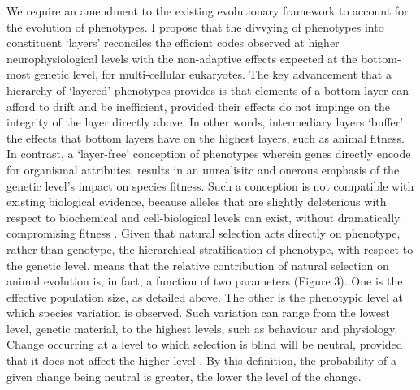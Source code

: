\documentclass{article}
\begin{document}
We require an amendment to the existing evolutionary framework to account for the evolution of phenotypes. I propose that the divvying of phenotypes into constituent `layers' \cite{Ho_Ohya_Zhang_2017, zhang_2018, wideman_doolittle_2019, mayr_1997} reconciles the efficient codes observed at higher neurophysiological levels with the non-adaptive effects expected at the bottom-most genetic level, for multi-cellular eukaryotes. The key advancement that a hierarchy of `layered' phenotypes provides is that elements of a bottom layer can afford to drift and be inefficient, provided their effects do not impinge on the integrity of the layer directly above. In other words, intermediary layers `buffer' the effects that bottom layers have on the highest layers, such as animal fitness. In contrast, a `layer-free' conception of phenotypes wherein genes directly encode for organismal attributes, results in an unrealisitc and onerous emphasis of the genetic level's impact on species fitness. Such a conception is not compatible with existing biological evidence, because alleles that are slightly deleterious with respect to biochemical and cell-biological levels can exist, without dramatically compromising fitness \cite{wideman_doolittle_2019}. Given that natural selection acts directly on phenotype, rather than genotype, the hierarchical stratification of phenotype, with respect to the genetic level, means that the relative contribution of natural selection on animal evolution is, in fact, a function of two parameters (Figure 3). One is the effective population size, as detailed above. The other is the phenotypic level at which species variation is observed. Such variation can range from the lowest level, genetic material, to the highest levels, such as behaviour and physiology. Change occurring at a level to which selection is blind will be neutral, provided that it does not affect the higher level \cite{mayr_1997, wideman_doolittle_2019, zhang_2018}. By this definition, the probability of a given change being neutral is greater, the lower the level of the change. 
\end{document}
